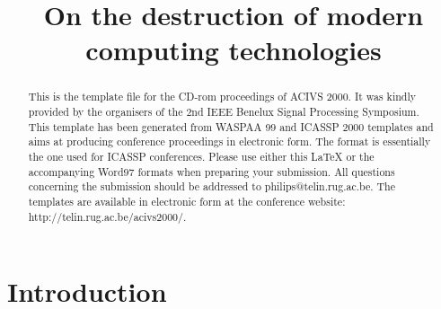 \documentclass{article}
\title{On the destruction of modern computing technologies}
\begin{document}
\maketitle

\begin{abstract}
{\ninept
This is the template file for the CD-rom proceedings of ACIVS 2000. It
was kindly provided by the organisers of the 2nd IEEE Benelux Signal
Processing Symposium. This template has been generated from {\sc WASPAA} 99 
and {\sc ICASSP} 2000 templates and aims at producing conference proceedings
in electronic form. The format is essentially the one used for ICASSP
conferences. 
Please use either this LaTeX or the accompanying Word97 formats when preparing your submission. All questions concerning the submission should be addressed to philips@telin.rug.ac.be.
The templates are available in electronic form at the conference website:\\ http://telin.rug.ac.be/acivs2000/.
}
\end{abstract}

\section{Introduction}
\end{document}
